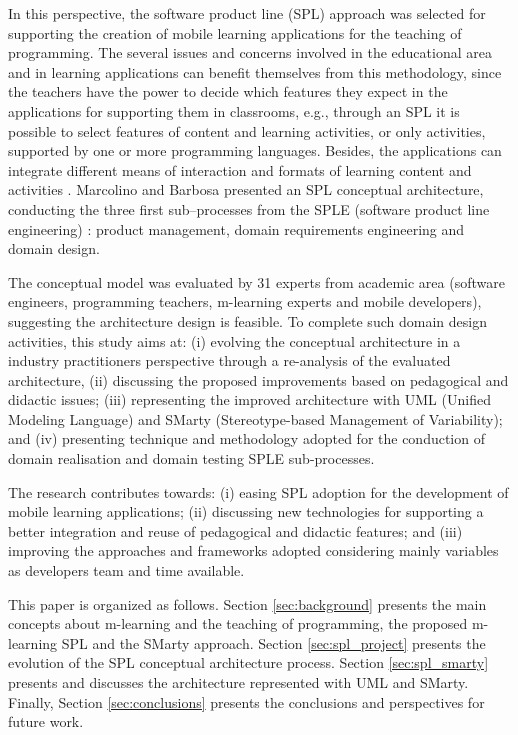 In this perspective, the software product line (SPL) approach was selected for supporting the creation of mobile learning applications for the teaching of programming. The several issues and concerns involved in the educational area and in learning applications can benefit themselves from this methodology, since the teachers have the power to decide which features they expect in the applications for supporting them in classrooms, e.g., through an SPL it is possible to select features of content and learning activities, or only activities, supported by one or more programming languages. Besides, the applications can integrate different means of interaction and formats of learning content and activities \cite{marcolino_spl2015, marcolinoarcht2017}. Marcolino and Barbosa \cite{marcolinoarcht2017} presented an SPL conceptual architecture, conducting the three first sub--processes from the SPLE (software product line engineering) \cite{6799220, pohl2005}: product management, domain requirements engineering and domain design. 


The conceptual model \cite{marcolinoarcht2017} was evaluated by 31 experts from academic area (software engineers, programming teachers, m-learning experts and mobile developers), suggesting the architecture design is feasible. To complete such domain design activities, this study aims at: (i) evolving the conceptual architecture in a industry practitioners perspective through a re-analysis of the evaluated architecture, (ii) discussing the proposed improvements based on pedagogical and didactic issues; (iii) representing the improved architecture with UML (Unified Modeling Language) and SMarty (Stereotype-based Management of Variability); and (iv) presenting technique and methodology adopted for the conduction of domain realisation and domain testing SPLE sub-processes.

The research contributes towards: (i) easing SPL adoption for the development of mobile learning applications; (ii) discussing new technologies for supporting a better integration and reuse of pedagogical and didactic features; and (iii) improving the approaches and frameworks adopted considering mainly variables as developers team and time available.


This paper is organized as follows. Section \ref{sec:background} presents the main concepts about m-learning and the teaching of programming, the proposed m-learning SPL and the SMarty approach. Section \ref{sec:spl_project} presents the evolution of the SPL conceptual architecture process. Section \ref{sec:spl_smarty} presents and discusses the architecture represented with UML and SMarty. Finally, Section \ref{sec:conclusions} presents the conclusions and perspectives for future work.

